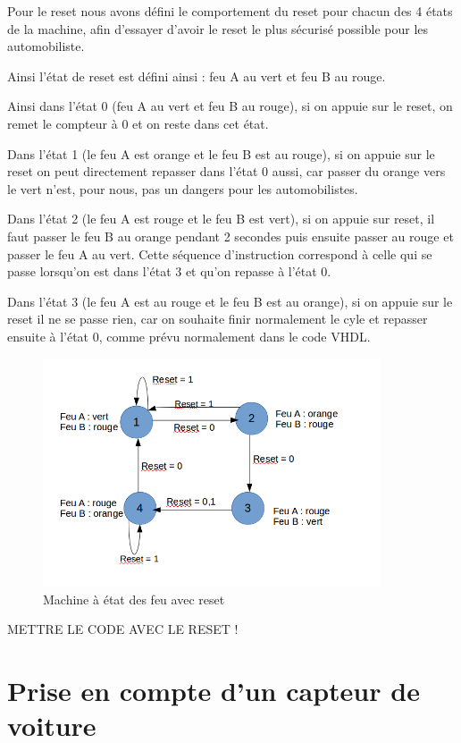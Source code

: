 \documentclass[11pt]{report}
\begin{document}
Pour le reset nous avons défini le comportement du reset pour chacun des 4 états de la machine, afin d'essayer d'avoir le reset le plus sécurisé possible pour les automobiliste. 

Ainsi l'état de reset est défini ainsi : feu A au vert et feu B au rouge. 

Ainsi dans l'état 0 (feu A au vert et feu B au rouge), si on appuie sur le reset, on remet le compteur à 0 et on reste dans cet état.

Dans l'état 1 (le feu A est orange et le feu B est au rouge), si on appuie sur le reset on peut directement repasser dans l'état 0 aussi, car passer du orange vers le vert n'est, pour nous, pas un dangers pour les automobilistes.

Dans l'état 2 (le feu A est rouge et le feu B est vert), si on appuie sur reset, il faut passer le feu B au orange pendant 2 secondes puis ensuite passer au rouge et passer le feu A au vert. Cette séquence d'instruction correspond à celle qui se passe lorsqu'on est dans l'état 3 et qu'on repasse à l'état 0.

Dans l'état 3 (le feu A est au rouge et le feu B est au orange), si on appuie sur le reset il ne se passe rien, car on souhaite finir normalement le cyle et repasser ensuite à l'état 0, comme prévu normalement dans le code VHDL. 

\begin{figure}[h]
\includegraphics[width=10cm]{TP03-3.png}
\caption{Machine à état des feu avec reset}
\end{figure}



METTRE LE CODE AVEC LE RESET !

\section{Prise en compte d'un capteur de voiture}
\end{document}
